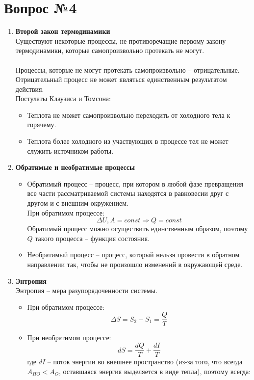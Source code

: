 \documentclass[14pt,a4paper]{scrartcl}
\begin{document}
\section*{Вопрос №4}
\begin{enumerate}[label=\arabic*)]
	\item \textbf{Второй закон термодинамики} \\
	Существуют некоторые процессы, не противоречащие первому закону термодинамики, которые самопроизвольно протекать не могут.\\ \\
	Процессы, которые не могут протекать самопроизвольно -- отрицательные. Отрицательный процесс не может являться единственным результатом действия. \\
	Постулаты Клаузиса и Томсона:
	\begin{itemize}
		\item Теплота не может самопроизвольно переходить от холодного тела к горячему.
		\item Теплота более холодного из участвующих в процессе тел не может служить источником работы.
	\end{itemize}
	\item \textbf{Обратимые и необратимые процессы} \\
	\begin{itemize}
		\item Обратимый процесс -- процесс, при котором в любой фазе превращения все части рассматриваемой системы находятся в равновесии друг с другом и с внешним окружением. \\
		При обратимом процессе: 
		$$ \Delta{U}, A = const  \Rightarrow Q = const  $$
		Обратимый процесс можно осуществить единственным образом, поэтому $Q$ такого процесса  -- функция состояния.
		\item Необратимый процесс -- процесс, который нельзя провести в обратном направлении так, чтобы не произошло изменений в окружающей среде.
	\end{itemize}
	\item \textbf{Энтропия} \\
	Энтропия -- мера разупорядоченности системы.
	\begin{itemize}
		\item При обратимом процессе:
		$$\Delta{S} = S_2 - S_1 = \dfrac{Q}{T} $$ 
		\item При необратимом процессе:
		$$ dS = \dfrac{dQ}{T} + \dfrac{dI}{T} $$
		где $dI$ -- поток энергии во внешнее пространство (из-за того, что всегда $A_{HO} < A_O$, оставшаяся энергия выделяется в виде тепла), поэтому всегда:

\end{itemize}
\end{enumerate}
\end{document}
